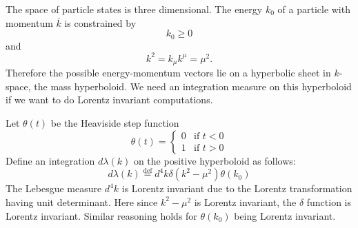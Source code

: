 
The space of particle states is three dimensional. The energy
$k_0$ of a particle with momentum $\overline{k}$ is constrained
by
\begin{equation}%
k_{0}\geq0
\end{equation}
and
\begin{equation}%
k^{2} = k_{\mu}k^{\mu} = \mu^{2}.
\end{equation}
Therefore the possible energy-momentum vectors lie on a
hyperbolic sheet in $k$-space, the mass hyperboloid. We need an
integration measure on this hyperboloid if we want to do Lorentz
invariant computations.

Let $\theta(t)$ be the Heaviside step function
\begin{equation}%
\theta(t) = \begin{cases} 0 &\text{if }t<0\\
1 & \text{if }t>0
\end{cases}
\end{equation}
Define an integration $d\lambda(k)$ on the positive hyperboloid
as follows:
\begin{equation}%
d\lambda(k) \stackrel{\text{def}}{=} d^{4}k \delta(k^{2}-\mu^{2})\theta(k_{0})
\end{equation}
The Lebesgue measure $d^{4}k$ is Lorentz invariant due to the
Lorentz transformation having unit determinant. Here since
$k^{2}-\mu^{2}$ is Lorentz invariant, the $\delta$ function is
Lorentz invariant. Similar reasoning holds for $\theta(k_{0})$
being Lorentz invariant.

